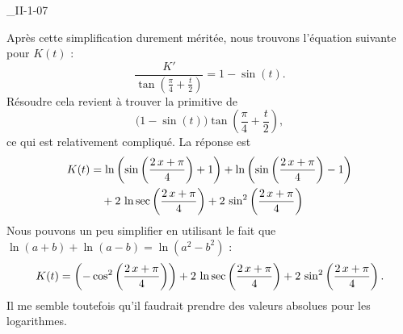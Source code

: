 \begin{corrige}{_II-1-07}
\begin{enumerate}
Après cette simplification durement méritée, nous trouvons l'équation suivante pour $K(t)$ :
\begin{equation}		\label{EqFracII107exoVVprb}
	\frac{ K' }{ \tan\left( \frac{ \pi }{ 4 }+\frac{ t }{ 2 } \right) }=1-\sin(t).
\end{equation}
Résoudre cela revient à trouver la primitive de
\begin{equation}
\big( 1-\sin(t) \big) \tan\left( \frac{ \pi }{ 4 }+\frac{ t }{ 2 } \right),
\end{equation}
ce qui est relativement compliqué. La réponse est
\begin{equation}
	\begin{aligned}[]
		K(t)	&=\ln \left(\sin \left({{2\,x+\pi}\over{4}}\right)+1\right)+\ln  \left(\sin \left({{2\,x+\pi}\over{4}}\right)-1\right)\\
			&\quad+2\,\ln \sec  \left({{2\,x+\pi}\over{4}}\right)+2\,\sin ^2\left({{2\,x+\pi}\over{4 }}\right)
	\end{aligned}
\end{equation}
Nous pouvons un peu simplifier en utilisant le fait que $\ln(a+b)+\ln(a-b)=\ln(a^2-b^2)$ :
\begin{equation}
	\begin{aligned}[]
		K(t)	=\left(-\cos^2 \left({{2\,x+\pi}\over{4}}\right)\right)
			+2\,\ln \sec  \left({{2\,x+\pi}\over{4}}\right)+2\,\sin ^2\left({{2\,x+\pi}\over{4 }}\right).
	\end{aligned}
\end{equation}
Il me semble toutefois qu'il faudrait prendre des valeurs absolues pour les logarithmes.

\end{enumerate}

\end{corrige}
